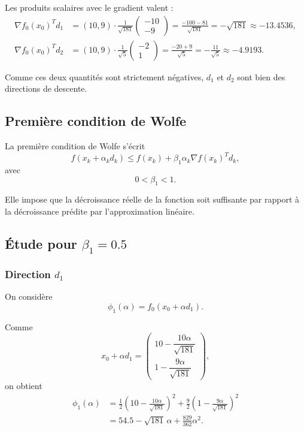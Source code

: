 \documentclass[a4paper,12pt]{article}
\begin{document}
	Les produits scalaires avec le gradient valent :
	\begin{align}
	\nabla f_0(x_0)^T d_1
	&=
	(10,9)\cdot \frac{1}{\sqrt{181}}
	\begin{pmatrix}
	-10\\
	-9
	\end{pmatrix}
	=
	\frac{-100-81}{\sqrt{181}}
	=
	-\sqrt{181}
	\approx -13.4536,
	\\
	\nabla f_0(x_0)^T d_2
	&=
	(10,9)\cdot \frac{1}{\sqrt{5}}
	\begin{pmatrix}
	-2\\
	1
	\end{pmatrix}
	=
	\frac{-20+9}{\sqrt{5}}
	=
	-\frac{11}{\sqrt{5}}
	\approx -4.9193.
	\end{align}
	
	Comme ces deux quantités sont strictement négatives, $d_1$ et $d_2$ sont bien des directions de descente.
	
	\subsection{Première condition de Wolfe}
	
	La première condition de Wolfe s'écrit
	\begin{equation}
	f(x_k+\alpha_k d_k)\leq f(x_k)+\beta_1\alpha_k \nabla f(x_k)^T d_k,
	\end{equation}
	avec
	\[
	0<\beta_1<1.
	\]
	
	Elle impose que la décroissance réelle de la fonction soit suffisante par rapport à la décroissance prédite par l'approximation linéaire.
	
	\subsection{Étude pour $\beta_1=0.5$}
	
	\subsubsection{Direction $d_1$}
	
	On considère
	\[
	\phi_1(\alpha)=f_0(x_0+\alpha d_1).
	\]
	
	Comme
	\[
	x_0+\alpha d_1=
	\begin{pmatrix}
	10-\dfrac{10\alpha}{\sqrt{181}}\\[0.2cm]
	1-\dfrac{9\alpha}{\sqrt{181}}
	\end{pmatrix},
	\]
	on obtient
	\begin{align}
	\phi_1(\alpha)
	&=
	\frac{1}{2}\left(10-\frac{10\alpha}{\sqrt{181}}\right)^2
	+
	\frac{9}{2}\left(1-\frac{9\alpha}{\sqrt{181}}\right)^2\\
	&=
	54.5-\sqrt{181}\,\alpha+\frac{829}{362}\alpha^2.
	\end{align}
	
\end{document}
